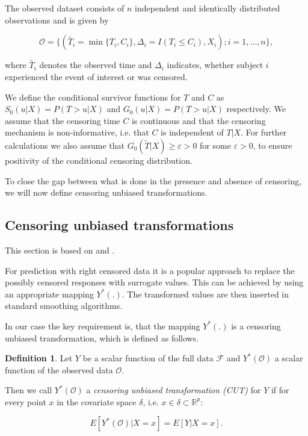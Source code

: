 \documentclass[12pt, a4paper]{article}
\theoremstyle{definition}
\newtheorem{Definition}{Definition}[section]
\theoremstyle{plain}
\numberwithin{equation}{section}
\numberwithin{figure}{section}
\numberwithin{table}{section}
\begin{document}
	The observed dataset consists of $n$ independent and identically distributed observations and is given by 
	
	\begin{equation*}
	\mathcal{O} = \{(\tilde{T_i} = \min \{T_i, C_i\}, \Delta_i = I(T_i \leq C_i), X_i); i = 1,\dots,n\},
	\end{equation*}
	 
	 where $\tilde{T_i}$ denotes the observed time and $\Delta_i$ indicates, whether subject $i$ experienced the event of interest or was censored.
	 
	 We define the conditional survivor functions for $T$ and $C$ as $S_0(u \vert X)=P(T>u \vert X)$ and $G_0(u \vert X)=P(T>u \vert X)$ respectively.
	 We assume that the censoring time $C$ is continuous and that the censoring mechanism is non-informative, i.e. that $C$ is independent of $T\vert X$.
	 For further calculations we also assume that $G_0(\tilde{T} \vert X)\geq \varepsilon > 0$ for some $\varepsilon >0$, to ensure positivity of the conditional censoring distribution.
	
	To close the gap between what is done in the presence and absence of censoring, we will now define censoring unbiased transformations.
	
	\subsection{Censoring unbiased transformations}\label{sec:drtrafo}
	This section is based on \citet*{culs} and \citet*{drcut}.
	
	For prediction with right censored data it is a popular approach to replace the possibly censored responses with surrogate values.
	This can be achieved by using an appropriate mapping $Y^*(.)$.
	The transformed values are then inserted in standard smoothing algorithms.
	
	In our case the key requirement is, that the mapping $Y^*(.)$ is a censoring unbiased transformation, which is defined as follows.
	
	\begin{Definition}
	Let $Y$ be a scalar function of the full data $\mathcal{F}$ and $Y^*(\mathcal{O})$ a scalar function of the observed data $\mathcal{O}$.
	
	Then we call $Y^*(\mathcal{O})$ a \textit{censoring unbiased transformation (CUT)} for $Y$ if for every point $x$ in the covariate space $\delta$, i.e. $x \in \delta \subset \mathbb{R}^p$:

	\begin{equation*}
	E[Y^*(\mathcal{O}) \vert X = x] = E[Y \vert X=x].
	\end{equation*}
	\end{Definition}
\end{document}

